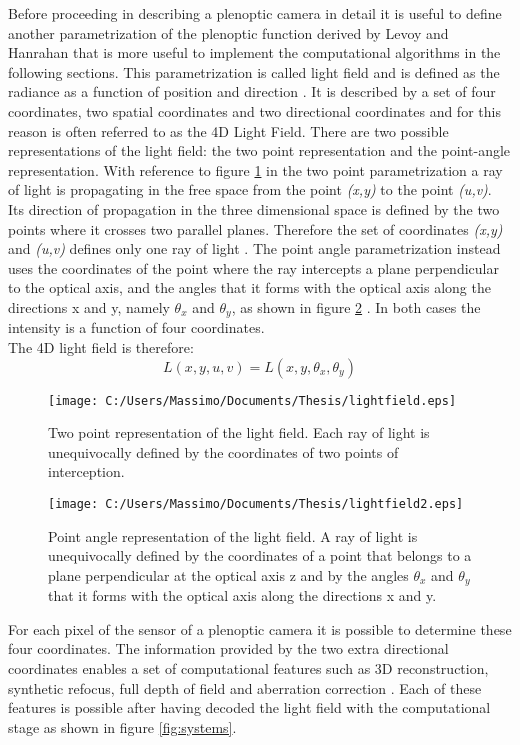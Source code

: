 Before proceeding in describing a plenoptic camera in detail it is useful to define another parametrization of the plenoptic function derived by Levoy and Hanrahan \cite{levoy1996light} that is more useful to implement the computational algorithms in the following sections. This parametrization is called light field and is defined as the radiance as a function of position and direction \cite{levoy1996light}. It is described by a set of four coordinates, two spatial coordinates and two directional coordinates and for this reason is often referred to as the 4D Light Field. There are two possible representations of the light field: the two point representation and the point-angle representation. With reference to figure \ref{fig:lightfield} in the two point parametrization a ray of light is propagating in the free space from the point \textit{(x,y)} to the point\textit{ (u,v)}. Its direction of propagation in the three dimensional space is defined by the two points where it crosses two parallel planes. Therefore the set of coordinates \textit{(x,y)} and \textit{(u,v)} defines only one ray of light \cite{levoy1996light}. The point angle parametrization instead uses the coordinates of the point where the ray intercepts a plane perpendicular to the optical axis, and the angles that it forms with the optical axis along the directions x and y, namely $\theta_x$  and $\theta_y$, as shown in figure \ref{fig:lightfield2} \cite{georgiev2006light}. In both cases the intensity is a function of four coordinates. \\ The 4D light field is therefore:
\begin{equation}
\label{eq:lightfield}
L(x,y,u,v) = L(x,y,\theta_x,\theta_y)
\end{equation}
\begin{figure}[H]
	\centering
	\texttt{[image: C:/Users/Massimo/Documents/Thesis/lightfield.eps]}
	\caption{\label{fig:lightfield}Two point representation of the light field. Each ray of light is unequivocally defined by the coordinates of two points of interception.}
\end{figure}
\begin{figure}[H]
	\centering
	\texttt{[image: C:/Users/Massimo/Documents/Thesis/lightfield2.eps]}
	\caption{\label{fig:lightfield2}Point angle representation of the light field. A ray of light is unequivocally defined by the coordinates of a point that belongs to a plane perpendicular at the optical axis z and by the angles $\theta_x$ and $\theta_y$ that it forms with the optical axis along the directions x and y.}
\end{figure}
For each pixel of the sensor of a plenoptic camera it is possible to determine these four coordinates. The information provided by the two extra directional coordinates enables a set of computational features such as 3D reconstruction, synthetic refocus, full depth of field and aberration correction \cite{ng2006digital}. Each of these features is possible after having decoded the light field with the computational stage as shown in figure \ref{fig:systems}.
